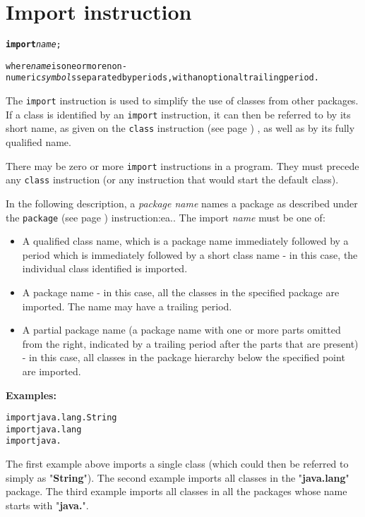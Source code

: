 \chapter{Import instruction}\label{refimport}
\begin{shaded}
\begin{alltt}
\textbf{import} \emph{name};

where \emph{name} is one or more non-numeric \emph{symbol}s separated by periods, with an optional trailing period.
\end{alltt}
\end{shaded}
 
The \texttt{import} instruction is used to simplify the use of
classes from other packages.
If a class is identified by an \texttt{import} instruction, it can then
be referred to by its short name, as given on the
 \texttt{class} instruction (see page \pageref{refclass}) , as well as by its fully
qualified name.
 
There may be zero or more \texttt{import} instructions in a program.
They must precede any \texttt{class} instruction (or any instruction
that would start the default class).
 
In the following description, a \emph{package name} names a package
as described under the  \texttt{package} (see page \pageref{refpackage}) 
instruction:ea..
The import \emph{name} must be one of:
\begin{itemize}
\item A qualified class name, which is a package name immediately followed
by a period which is immediately followed by a short class name -
in this case, the individual class identified is imported.
\item A package name - in this case, all the classes in the specified
package are imported.  The name may have a trailing period.
\item A partial package name (a package name with one or more parts
omitted from the right, indicated by a trailing period after the parts
that are present) - in this case, all classes in the package hierarchy
below the specified point are imported.
\end{itemize}
 \textbf{Examples:}
\begin{alltt}
import java.lang.String
import java.lang
import java.
\end{alltt}
The first example above imports a single class (which could then be
referred to simply as "\textbf{String}").
The second example imports all classes in the
"\textbf{java.lang}" package.
The third example imports all classes in all the packages whose name
starts with "\textbf{java.}".
 
